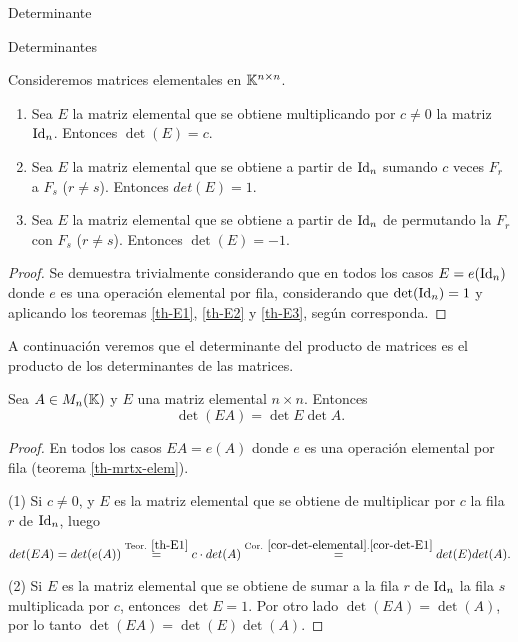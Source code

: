 \begin{chapter}{Determinante}
\begin{section}{Determinantes}
  \begin{corolario}\label{cor-det-elemental} Consideremos matrices elementales en $\mathbb K^{n \times n}$.
      \begin{enumerate}
          \item\label{cor-det-E1} Sea $E$ la matriz elemental que se obtiene  multiplicando por $c\ne 0$ la matriz $\operatorname{Id}_n$.  Entonces $\det(E) = c$.
          \item\label{cor-det-E2} Sea $E$ la matriz elemental que se obtiene a partir de $\operatorname{Id}_n$  sumando $c$ veces $F_r$  a $F_s$ ($r\ne s$).  Entonces $det(E) = 1$.
          \item\label{cor-det-E3} Sea $E$ la matriz elemental que se obtiene a partir de $\operatorname{Id}_n$ de permutando la $F_r$ con  $F_s$ ($r\ne s$).  Entonces $\det(E)=-1$.
      \end{enumerate}
  \end{corolario}
  \begin{proof}
      Se  demuestra trivialmente considerando que en todos los casos $E=e(\operatorname{Id}_n)$ donde $e$  es una operación elemental por fila,  considerando  que $\det(\operatorname{Id}_n)=1$  y aplicando los teoremas \ref{th-E1}, \ref{th-E2} y \ref{th-E3},  según corresponda.
  \end{proof}

  A continuación veremos que el determinante del producto de matrices es el producto de los determinantes de las matrices.

  \begin{teorema}\label{det-elem-por-mtrx} Sea $A  \in M_n(\mathbb K)$ y $E$ una matriz elemental $n \times n$. Entonces
      \begin{equation}\label{det-prod-elem-matr}
          \det (EA) = \det E \det A.
      \end{equation}
  \end{teorema}
  \begin{proof}
      En todos los casos $EA = e(A)$ donde $e$  es una operación elemental por fila (teorema \ref{th-mrtx-elem}).


      (1) Si $c \not=0$, y $E$ es la matriz elemental que se obtiene de multiplicar por  $c$ la fila $r$ de $\operatorname{Id}_n$, luego
      \begin{equation*}
          det(EA) = det(e(A)) \stackrel{\text{Teor. }\ref{th-E1}}{=} c \cdot det(A)  \stackrel{\text{Cor. }\ref{cor-det-elemental}.\ref{cor-det-E1}}{=} det(E) det(A).
      \end{equation*}


      (2) Si $E$ es la matriz elemental que se obtiene de sumar a la fila $r$ de $\operatorname{Id}_n$  la fila $s$ multiplicada por $c$, entonces $\det E =1$. Por  otro lado  $\det(EA) = \det(A)$, por lo tanto  $\det(EA) = \det(E)\det(A)$.


\end{proof}
\end{section}
\end{chapter}
